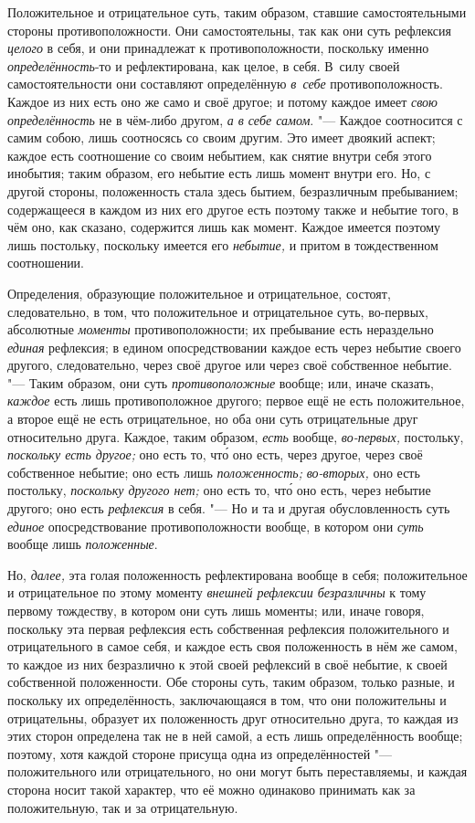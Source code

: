 Положительное и отрицательное суть, таким образом, ставшие самостоятельными
стороны противоположности. Они самостоятельны, так как они суть рефлексия
{\em целого} в себя, и они принадлежат к
противоположности, поскольку именно
{\em определённость}-то и рефлектирована, как целое,
в себя. В~силу своей самостоятельности они составляют определённую
{\em в~себе} противоположность. Каждое из них есть оно
же само и своё другое; и потому каждое имеет {\em свою
определённость} не в чём-либо другом, {\em а в себе
самом}. "--- Каждое соотносится с самим собою, лишь соотносясь со своим
другим. Это имеет двоякий аспект; каждое есть соотношение со своим
небытием, как снятие внутри себя этого инобытия; таким образом, его небытие
есть лишь момент внутри его. Но, с другой стороны, положенность стала здесь
бытием, безразличным пребыванием; содержащееся в каждом из них его другое
есть поэтому также и небытие того, в чём оно, как сказано, содержится лишь
как момент. Каждое имеется поэтому лишь постольку, поскольку имеется его
{\em небытие,} и притом в тождественном соотношении.

Определения, образующие положительное и отрицательное, состоят,
следовательно, в том, что положительное и отрицательное суть, во-первых,
абсолютные {\em моменты} противоположности; их
пребывание есть нераздельно {\em единая} рефлексия; в
едином опосредствовании каждое есть через небытие своего другого,
следовательно, через своё другое или через своё собственное небытие. "---
Таким образом, они суть {\em противоположные} вообще;
или, иначе сказать, {\em каждое} есть лишь
противоположное другого; первое ещё не есть положительное, а второе ещё не
есть отрицательное, но оба они суть отрицательные друг относительно друга.
Каждое, таким образом, {\em есть} вообще,
{\em во-первых,} постольку,
{\em поскольку есть другое;} оно есть то, чт\'{о} оно есть,
через другое, через своё собственное небытие; оно есть лишь
{\em положенность;} {\em во-вторых,} оно есть постольку,
{\em поскольку другого нет;} оно есть то, чт\'{о} оно есть,
через небытие другого; оно есть {\em рефлексия} в себя.
"--- Но и та и другая обусловленность суть {\em единое}
опосредствование противоположности вообще, в котором они
{\em суть} вообще лишь {\em положенные}.

Но, {\em далее,} эта голая положенность рефлектирована
вообще в себя; положительное и отрицательное по этому моменту
{\em внешней рефлексии безразличны} к тому первому
тождеству, в котором они суть лишь моменты; или, иначе говоря, поскольку
эта первая рефлексия есть собственная рефлексия положительного и
отрицательного в самое себя, и каждое есть своя положенность в нём же
самом, то каждое из них безразлично к этой своей рефлексий в своё небытие,
к своей собственной положенности. Обе стороны суть, таким образом, только
разные, и поскольку их определённость, заключающаяся в том, что они
положительны и отрицательны, образует их положенность друг относительно
друга, то каждая из этих сторон определена так не в ней самой, а есть лишь
определённость вообще; поэтому, хотя каждой стороне присуща одна из
определённостей "--- положительного или отрицательного, но они могут быть
переставляемы, и каждая сторона носит такой характер, что её можно
одинаково принимать как за положительную, так и за отрицательную.

